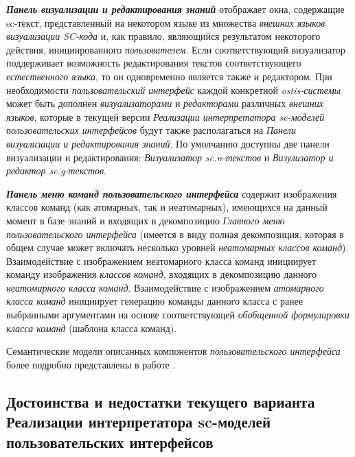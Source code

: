 \textbf{\textit{Панель визуализации и редактирования знаний}} отображает окна, содержащие sc-текст, представленный на некотором языке из множества \textit{внешних языков визуализации SC-кода} и, как правило, являющийся результатом некоторого действия, инициированного \textit{пользователем}. Если соответствующий визуализатор поддерживает возможность редактирования текстов соответствующего \textit{естественного языка}, то он одновременно является также и редактором. При необходимости \textit{пользовательский интерфейс} каждой конкретной \textit{ostis-системы} может быть дополнен \textit{визуализаторами} и \textit{редакторами} различных \textit{внешних языков}, которые в текущей версии \textit{Реализации интерпретатора sc-моделей пользовательских интерфейсов} будут также располагаться на \textit{Панели визуализации и редактирования знаний}. По умолчанию доступны две панели визуализации и редактирования: \textit{Визуализатор sc.n-текстов} и \textit{Визулизатор и редактор sc.g-текстов}.

\textbf{\textit{Панель меню команд пользовательского интерфейса}} содержит изображения классов команд (как атомарных, так и неатомарных), имеющихся на данный момент в базе знаний и входящих в декомпозицию \textit{Главного меню пользовательского интерфейса} (имеется в виду полная декомпозиция, которая в общем случае может включать несколько уровней \textit{неатомарных классов команд}). Взаимодействие с изображением неатомарного класса команд инициирует команду изображения \textit{классов} \textit{команд}, входящих в декомпозицию данного \textit{неатомарного класса команд}. Взаимодействие с изображением \textit{атомарного класса команд} инициирует генерацию команды данного класса с ранее выбранными аргументами на основе соответствующей \textit{обобщенной формулировки класса команд} (шаблона класса команд).

Семантические модели описанных компонентов \textit{пользовательского интерфейса} более подробно представлены в работе .

\subsection{Достоинства и недостатки текущего варианта Реализации интерпретатора sc-моделей пользовательских интерфейсов}
\label{sec_soft_platform_sci_machine_problems}

